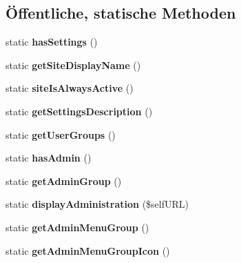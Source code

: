 \subsection*{Öffentliche, statische Methoden}
\begin{DoxyCompactItemize}
\item 
\mbox{\label{class_all_ink_mail_aa6139127dd2e6f2d8bbee7a32191fafd}} 
static {\bfseries has\+Settings} ()
\item 
\mbox{\label{class_all_ink_mail_a785ccf102b1ac324a9ad83af73b10a36}} 
static {\bfseries get\+Site\+Display\+Name} ()
\item 
\mbox{\label{class_all_ink_mail_a33c663c13d8dc4859eac76253cb90e3c}} 
static {\bfseries site\+Is\+Always\+Active} ()
\item 
\mbox{\label{class_all_ink_mail_aa603ee1ee11276163f71b0fe063a19de}} 
static {\bfseries get\+Settings\+Description} ()
\item 
\mbox{\label{class_all_ink_mail_abe71780e1a475fd29666cc13992fae39}} 
static {\bfseries get\+User\+Groups} ()
\item 
\mbox{\label{class_all_ink_mail_a7ef213ab462aacf9d67c4eda85afb882}} 
static {\bfseries has\+Admin} ()
\item 
\mbox{\label{class_all_ink_mail_a93456f30b522786a96cc217fc22da2ef}} 
static {\bfseries get\+Admin\+Group} ()
\item 
\mbox{\label{class_all_ink_mail_af921980001a4c374dac942f8eeead153}} 
static {\bfseries display\+Administration} (\$self\+U\+RL)
\item 
\mbox{\label{class_all_ink_mail_aa3b75610edc6c5b4a5659ed4ac180fd3}} 
static {\bfseries get\+Admin\+Menu\+Group} ()
\item 
\mbox{\label{class_all_ink_mail_ad755a11a1b612ed4a594adfdc6ffd0a1}} 
static {\bfseries get\+Admin\+Menu\+Group\+Icon} ()
\end{DoxyCompactItemize}
